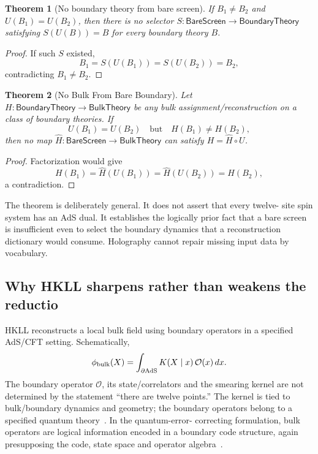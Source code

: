 \documentclass[10pt,a4paper]{article}
\newtheorem{theorem}{Theorem}[section]
\theoremstyle{definition}
\theoremstyle{remark}
\begin{document}
\begin{theorem}[No boundary theory from bare screen]
\label{thm:noboundary}
If \(B_1\neq B_2\) and \(U(B_1)=U(B_2)\), then there is no selector
\(S:\mathsf{BareScreen}\to\mathsf{BoundaryTheory}\) satisfying
\(S(U(B))=B\) for every boundary theory \(B\).
\end{theorem}

\begin{proof}
If such \(S\) existed,
\[
B_1=S(U(B_1))=S(U(B_2))=B_2,
\]
contradicting \(B_1\neq B_2\).
\end{proof}

\begin{theorem}[No Bulk From Bare Boundary]
\label{thm:nobulk}
Let \(H:\mathsf{BoundaryTheory}\to\mathsf{BulkTheory}\) be any bulk
assignment/reconstruction on a class of boundary theories.  If
\[
U(B_1)=U(B_2)
\quad\text{but}\quad
H(B_1)\neq H(B_2),
\]
then no map \(\widehat H:\mathsf{BareScreen}\to\mathsf{BulkTheory}\) can
satisfy \(H=\widehat H\circ U\).
\end{theorem}

\begin{proof}
Factorization would give
\[
H(B_1)=\widehat H(U(B_1))=\widehat H(U(B_2))=H(B_2),
\]
a contradiction.
\end{proof}

The theorem is deliberately general.  It does not assert that every twelve-
site spin system has an AdS dual.  It establishes the logically prior fact
that a bare screen is insufficient even to select the boundary dynamics that
a reconstruction dictionary would consume.  Holography cannot repair missing
input data by vocabulary.

\subsection{Why HKLL sharpens rather than weakens the reductio}

HKLL reconstructs a local bulk field using boundary operators in a specified
AdS/CFT setting.  Schematically,
\[
\phi_{\rm bulk}(X)
=\int_{\partial\mathrm{AdS}}K(X\mid x)\,\mathcal O(x)\,dx .
\]
The boundary operator \(\mathcal O\), its state/correlators and the smearing
kernel are not determined by the statement ``there are twelve points.''  The
kernel is tied to bulk/boundary dynamics and geometry; the boundary operators
belong to a specified quantum theory~\cite{HKLL2006}.  In the quantum-error-
correcting formulation, bulk operators are logical information encoded in a
boundary code structure, again presupposing the code, state space and operator
algebra~\cite{ADH2015}.
\end{document}
